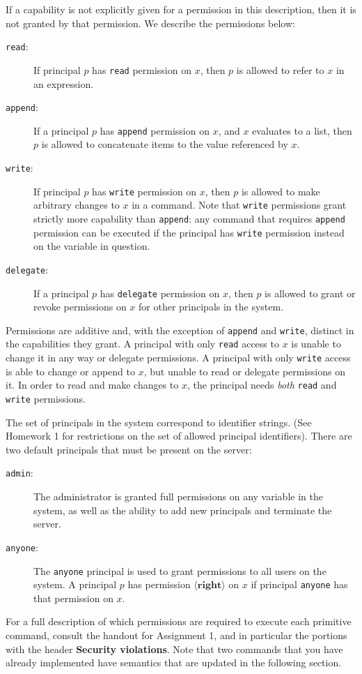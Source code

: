 \documentclass[11pt]{article}
\begin{document}
If a capability is not explicitly given for a permission in this description, then it is not granted by that permission. 
We describe the permissions below:
\begin{description}
\item[\texttt{read}:] If principal $p$ has \texttt{read} permission on $x$, then $p$ is allowed to refer to $x$ in an expression.
\item[\texttt{append}:] If a principal $p$ has \texttt{append} permission on $x$, and $x$ evaluates to a list, then $p$ is allowed to concatenate items to the value referenced by $x$.
\item[\texttt{write}:] If principal $p$ has \texttt{write} permission on $x$, then $p$ is allowed to make arbitrary changes to $x$ in a command. Note that \texttt{write} permissions grant strictly more capability than \texttt{append}: any command that requires \texttt{append} permission can be executed if the principal has \texttt{write} permission instead on the variable in question.
\item[\texttt{delegate}:] If a principal $p$ has \texttt{delegate} permission on $x$, then $p$ is allowed to grant or revoke permissions on $x$ for other principals in the system.
\end{description}
Permissions are additive and, with the exception of \texttt{append} and \texttt{write}, distinct in the capabilities they grant. A principal with only \texttt{read} access to $x$ is unable to change it in any way or delegate permissions. A principal with only \texttt{write} access is able to change or append to $x$, but unable to read or delegate permissions on it. In order to read and make changes to $x$, the principal needs \emph{both} \texttt{read} and \texttt{write} permissions.

The set of principals in the system correspond to identifier strings. (See Homework 1 for restrictions on the set of allowed principal identifiers). There are two default principals that must be present on the server:
\begin{description}
\item[\texttt{admin}:] The administrator is granted full permissions on any variable in the system, as well as the ability to add new principals and terminate the server.
\item[\texttt{anyone}:] The \texttt{anyone} principal is used to grant permissions to all users on the system. A principal $p$ has permission $\langle\mathbf{right}\rangle$ on $x$ if principal \texttt{anyone} has that permission on $x$.
\end{description}
For a full description of which permissions are required to execute each primitive command, consult the handout for Assignment 1, and in particular the portions with the header \textbf{Security violations}. Note that two commands that you have already implemented have semantics that are updated in the following section.
\end{document}
